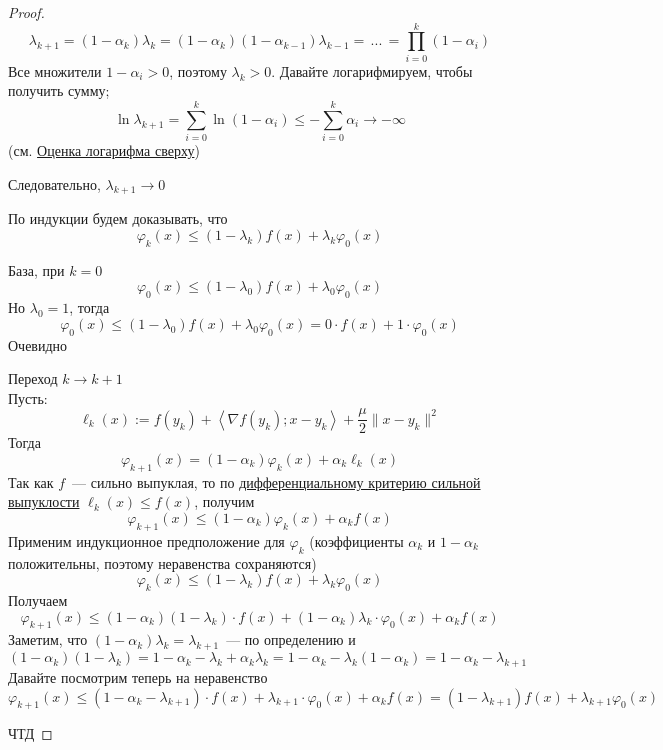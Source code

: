 \begin{proof}
  \[
  \lambda_{k+1} = (1-\alpha_k) \lambda_k = (1-\alpha_k)(1-\alpha_{k-1})\lambda_{k-1} = \, ...\, = \prod\limits_{i=0}^k (1-\alpha_i)
  \]
  Все множители $1 - \alpha_i > 0$, поэтому $\lambda_k > 0$. Давайте логарифмируем, чтобы получить сумму;
  \[
  \ln \lambda_{k+1} = \sum\limits_{i=0}^k \ln(1 - \alpha_i) \le - \sum\limits_{i=0}^k \alpha_i \rightarrow - \infty
  \]
  (см. \hyperref[note:41B4A714-C1F8-4267-9948-E13E99B30587]{Оценка логарифма сверху})

  Следовательно,  $\lambda_{k+1} \rightarrow 0$

  По индукции будем доказывать, что
  \[
  \varphi_k(x) \le (1-\lambda_k)f(x) + \lambda_k\varphi_0(x)
  \]

  База, при $k=0$
  \[
  \varphi_0(x) \le (1-\lambda_0) f(x) + \lambda_0 \varphi_0(x)
  \]
  Но $\lambda_0 = 1$, тогда
  \[
  \varphi_0(x) \le (1-\lambda_0) f(x) + \lambda_0 \varphi_0(x) = 0 \cdot f(x) + 1 \cdot \varphi_0(x)
  \]
  Очевидно

  Переход  $k \rightarrow k+1$ \\
  Пусть:
  \[
  \ell_k(x):= f(y_k) + \left\langle \nabla f(y_k); x-y_k \right\rangle + \frac{\mu}{2} \|x-y_k\|^2
  \]
  Тогда
  \[
  \varphi_{k+1}(x) = (1-\alpha_k)\varphi_k(x) + \alpha_k \ell_k(x)
  \]
  Так как $f$~--- сильно выпуклая, то по \hyperref[note:1B5A3E25-56E8-4D5E-9CF6-E2731DA77604]{дифференциальному критерию сильной выпуклости} $\ell_k(x) \le f(x)$, получим
  \[
  \varphi_{k+1}(x) \le (1-\alpha_k)\varphi_k(x) + \alpha_k f(x)
  \]
  Применим индукционное предположение для $\varphi_k$ (коэффициенты $\alpha_k$ и $1 - \alpha_k$ положительны, поэтому неравенства сохраняются)
  \[
  \varphi_k(x) \le (1-\lambda_k) f(x) + \lambda_k \varphi_0(x)
  \]
  Получаем
  \[
  \varphi_{k+1}(x) \le (1-\alpha_k)(1-\lambda_k) \cdot f(x) + (1-\alpha_k)\lambda_k \cdot \varphi_0(x) + \alpha_k f(x)
  \]
  Заметим, что $(1-\alpha_k)\lambda_k = \lambda_{k+1}$~--- по определению и
  \[
  (1-\alpha_k)(1-\lambda_k) = 1 - \alpha_k - \lambda_k + \alpha_k\lambda_k = 1-\alpha_k - \lambda_k(1 - \alpha_k) = 1-\alpha_k - \lambda_{k+1}
  \]
  Давайте посмотрим теперь на неравенство
  \[
  \varphi_{k+1}(x) \le (1-\alpha_k-\lambda_{k+1}) \cdot f(x) + \lambda_{k+1} \cdot \varphi_0(x) + \alpha_k f(x) =
  (1-\lambda_{k+1})f(x) + \lambda_{k+1} \varphi_0(x)
  \]

  ЧТД
\end{proof}
